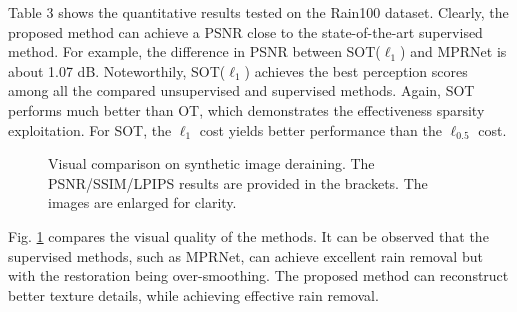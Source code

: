 \documentclass[10pt,journal,compsoc]{IEEEtran}
\begin{document}
Table 3 shows the quantitative results tested on the Rain100 dataset. 
Clearly, the proposed method can achieve a PSNR close to the state-of-the-art 
supervised method. For example, the difference in PSNR between SOT($\ell_{1}$) 
and MPRNet is about 1.07 dB. Noteworthily, SOT($\ell_{1}$) 
achieves the best perception scores among all the compared unsupervised 
and supervised methods.
Again, SOT performs much better than OT, which demonstrates the 
effectiveness sparsity exploitation. For SOT, the $\ell_{1}$ cost
yields better performance than the $\ell_{0.5}$ cost.

\begin{figure}[!t]
	\centering
	\caption{Visual comparison on synthetic image deraining. The PSNR/SSIM/LPIPS results are provided in the brackets. The images are enlarged for clarity.}
	\label{figure4}
\end{figure}

Fig. \ref{figure4} compares the visual quality of the methods.
It can be observed that the supervised methods, such as MPRNet, 
can achieve excellent rain removal but with the restoration being over-smoothing.
The proposed method can reconstruct better texture details, 
while achieving effective rain removal.
\end{document}
